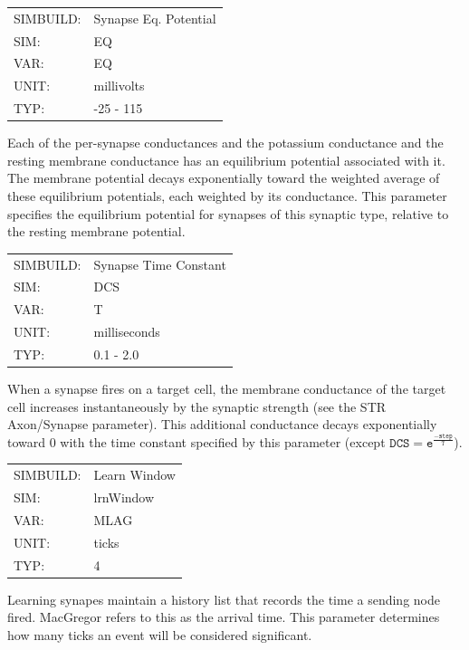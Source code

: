 \documentclass[12pt,openany,oneside]{book}
\newcommand{\tmcode}[1]{\mathtt{#1}}
\begin{document}
\begin{flushleft}
\begin{tabular}{@{}ll@{}}
SIMBUILD: & Synapse Eq. Potential\\
SIM: & EQ\\
VAR: & EQ\\
UNIT: & millivolts\\
TYP: & -25 - 115\\
\end{tabular}
\end{flushleft}
\noindent
Each of the per-synapse conductances and the potassium conductance and
the resting membrane conductance has an equilibrium potential
associated with it. The membrane potential decays exponentially
toward the weighted average of these equilibrium potentials, each
weighted by its conductance. This parameter specifies the equilibrium
potential for synapses of this synaptic type, relative to the resting
membrane potential.
\filbreak
\vspace{\baselineskip}

\begin{flushleft}
\begin{tabular}{@{}ll@{}}
SIMBUILD: & Synapse Time Constant\\
SIM: & DCS\\
VAR: & T\\
UNIT: & milliseconds\\
TYP: & 0.1 - 2.0\\
\end{tabular}
\end{flushleft}
\noindent
When a synapse fires on a target cell, the membrane conductance of the
target cell increases instantaneously by the synaptic strength (see
the STR Axon/Synapse parameter). This additional conductance decays
exponentially toward 0 with the time constant specified by this
parameter (except $\tmcode{DCS = e^{\tfrac{-step}{T}}}$).
\filbreak
\vspace{\baselineskip}

\begin{flushleft}
\begin{tabular}{@{}ll@{}}
SIMBUILD: & Learn Window\\
SIM: & lrnWindow\\
VAR: & MLAG\\
UNIT: & ticks\\
TYP: & 4\\
\end{tabular}
\end{flushleft}
\noindent
Learning synapes maintain a history list that records the time
a sending node fired. MacGregor \citet{macgregor1987neural} 
refers to this as the arrival time.  This parameter determines 
how many ticks an event will be considered significant. 
\end{document}

